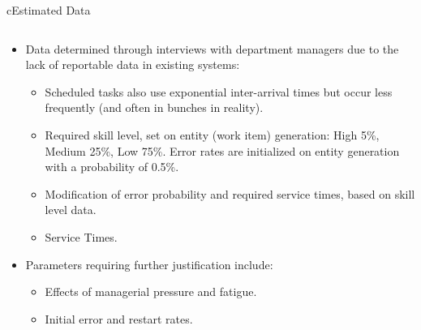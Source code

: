 \begin{myslide}{c}{Estimated Data}

\begin{columns}

\begin{column}{1\textwidth}

\begin{itemize}

\item Data determined through interviews with department managers due to the lack of reportable data in existing systems:

    \begin{itemize}
        \item Scheduled tasks also use exponential inter-arrival times but occur less frequently (and often in bunches in reality).
       \item Required skill level, set on entity (work item) generation: High 5\%, Medium 25\%, Low 75\%.
       \tiem Error rates are initialized on entity generation with a probability of 0.5\%.
       \item Modification of error probability and required service times, based on skill level data.
       \item Service Times.
    \end{itemize}

\item Parameters requiring further justification include:

    \begin{itemize}
        \item Effects of managerial pressure and fatigue.
        \item Initial error and restart rates.
    \end{itemize}

\end{itemize}

\end{column}

\end{columns}

\end{myslide}

